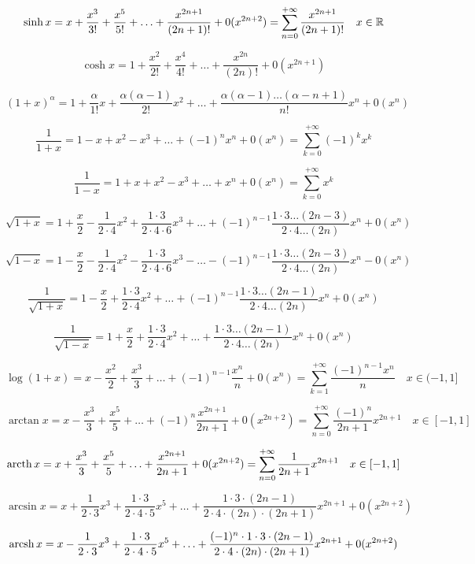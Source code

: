 \documentclass{book}
\begin{document}
$$
\sinh x=x + \frac{ x^3}{3!}+\frac{ x^5}{5!}+\ldots+ \frac{x^{2n+1}}{(2n+1)!}+
0(x^{2n+2})
=
\sum_{n=0}^{+\infty} \frac{x^{2n+1}}{(2n+1)!}
\quad x \in \mathbb{R}
$$

$$
\cosh x =
1 + \frac{ x^2}{2!} + \frac{ x^4}{4!}
+ \ldots +
\frac{ x^{2n}}{(2n)!} + 0(x^{2n+1})
$$

$$
(1+x)^\alpha = 1+\frac{ \alpha}{1!}x + \frac{ \alpha(\alpha-1)}{2!}x^2
+\ldots+
\frac{ \alpha(\alpha-1)\ldots(\alpha-n+1)}{n!}x^n+
0(x^n)
$$

$$ \frac{ 1}{1+x}= 1 -x +x^2-x^3+\ldots +(-1)^n x^n +0(x^n)=\sum_{k=0}^{+\infty}(-1)^kx^k $$

$$ \frac{ 1}{1-x}= 1 +x +x^2-x^3+\ldots +x^n +0(x^n)=\sum_{k=0}^{+\infty}x^k $$

$$
\sqrt{1+x}= 1+\frac{ x}{2}-\frac{ 1}{2\cdot 4}x^2+ \frac{ 1\cdot3}{2\cdot4\cdot6}x^3
+\ldots+
(-1)^{n-1} \frac{1\cdot3\ldots(2n-3)}{2\cdot4\ldots(2n)}x^n +0(x^n)
$$

$$
\sqrt{1-x}= 1-\frac{ x}{2}-\frac{ 1}{2\cdot 4}x^2- \frac{ 1\cdot3}{2\cdot4\cdot6}x^3
-\ldots-
(-1)^{n-1} \frac{1\cdot3\ldots(2n-3)}{2\cdot4\ldots(2n)}x^n -0(x^n)
$$

$$
\frac{ 1}{\sqrt{1+x}}
= 1-\frac{ x}{2}+\frac{ 1\cdot3}{2\cdot 4}x^2
+\ldots+
(-1)^{n-1} \frac{1\cdot3\ldots(2n-1)}{2\cdot4\ldots(2n)}x^n +0(x^n)
$$

$$
\frac{ 1}{\sqrt{1-x}}
= 1+\frac{ x}{2}+\frac{ 1\cdot3}{2\cdot 4}x^2
+\ldots+
\frac{1\cdot3\ldots(2n-1)}{2\cdot4\ldots(2n)}x^n +0(x^n)
$$

$$
\log (1+x)=
x-\frac{ x^2}{2}+\frac{ x^3}{3}+\ldots+ (-1)^{n-1} \frac{ x^n}{n}+0(x^n)
=\sum_{k=1}^{+\infty}\frac{(-1)^{n-1}x^n}{n}
\quad x\in(-1,1]
$$

$$
\arctan x=x-\frac{ x^3}{3}+\frac{ x^5}{5}+\ldots+ (-1)^n \frac{x^{2n+1}}{2n+1}+
0(x^{2n+2})
=
\sum_{n=0}^{+\infty} \frac{(-1)^n}{2n+1} x^{2n+1}
\quad x\in[-1,1]
$$

$$
\operatorname{arcth} x=x+\frac{ x^3}{3}+\frac{ x^5}{5}+\ldots+ \frac{x^{2n+1}}{2n+1}+
0(x^{2n+2})
=
\sum_{n=0}^{+\infty} \frac{1}{2n+1} x^{2n+1}
\quad x\in[-1,1]
$$


$$
\arcsin x=
x+ \frac{ 1}{2\cdot3}x^3+\frac{1\cdot3}{2\cdot4\cdot5}x^5
+\ldots+
\frac{ 1\cdot3\cdot(2n-1)}{2\cdot4\cdot(2n)\cdot(2n+1)}x^{2n+1}+0(x^{2n+2})
$$

$$
\operatorname{arcsh} x=
x-\frac{ 1}{2\cdot3}x^3+\frac{1\cdot3}{2\cdot4\cdot5}x^5
+\ldots+
\frac{ (-1)^n \cdot1\cdot3\cdot(2n-1)}{2\cdot4\cdot(2n)\cdot(2n+1)}x^{2n+1}+0(x^{2n+2})
$$
\end{document}
